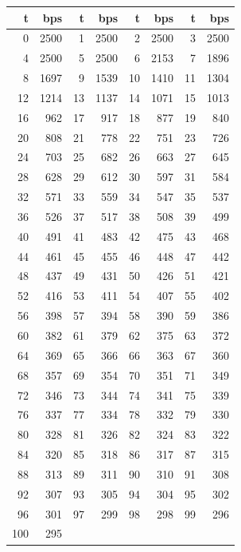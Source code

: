 \begin{tabular}{@{}rr@{\hspace{9pt}}rr@{\hspace{9pt}}rr@{\hspace{9pt}}rr@{}}
\toprule
\textbf{t} & \textbf{bps} & \textbf{t} & \textbf{bps} & \textbf{t} & \textbf{bps} & \textbf{t} & \textbf{bps} \\
\midrule
0 & 2500 & 1 & 2500 & 2 & 2500 & 3 & 2500 \\
4 & 2500 & 5 & 2500 & 6 & 2153 & 7 & 1896 \\
8 & 1697 & 9 & 1539 & 10 & 1410 & 11 & 1304 \\
12 & 1214 & 13 & 1137 & 14 & 1071 & 15 & 1013 \\
16 & 962 & 17 & 917 & 18 & 877 & 19 & 840 \\
20 & 808 & 21 & 778 & 22 & 751 & 23 & 726 \\
24 & 703 & 25 & 682 & 26 & 663 & 27 & 645 \\
28 & 628 & 29 & 612 & 30 & 597 & 31 & 584 \\
32 & 571 & 33 & 559 & 34 & 547 & 35 & 537 \\
36 & 526 & 37 & 517 & 38 & 508 & 39 & 499 \\
40 & 491 & 41 & 483 & 42 & 475 & 43 & 468 \\
44 & 461 & 45 & 455 & 46 & 448 & 47 & 442 \\
48 & 437 & 49 & 431 & 50 & 426 & 51 & 421 \\
52 & 416 & 53 & 411 & 54 & 407 & 55 & 402 \\
56 & 398 & 57 & 394 & 58 & 390 & 59 & 386 \\
60 & 382 & 61 & 379 & 62 & 375 & 63 & 372 \\
64 & 369 & 65 & 366 & 66 & 363 & 67 & 360 \\
68 & 357 & 69 & 354 & 70 & 351 & 71 & 349 \\
72 & 346 & 73 & 344 & 74 & 341 & 75 & 339 \\
76 & 337 & 77 & 334 & 78 & 332 & 79 & 330 \\
80 & 328 & 81 & 326 & 82 & 324 & 83 & 322 \\
84 & 320 & 85 & 318 & 86 & 317 & 87 & 315 \\
88 & 313 & 89 & 311 & 90 & 310 & 91 & 308 \\
92 & 307 & 93 & 305 & 94 & 304 & 95 & 302 \\
96 & 301 & 97 & 299 & 98 & 298 & 99 & 296 \\
100 & 295 &  &  &  &  &  &  \\
\bottomrule
\end{tabular}
